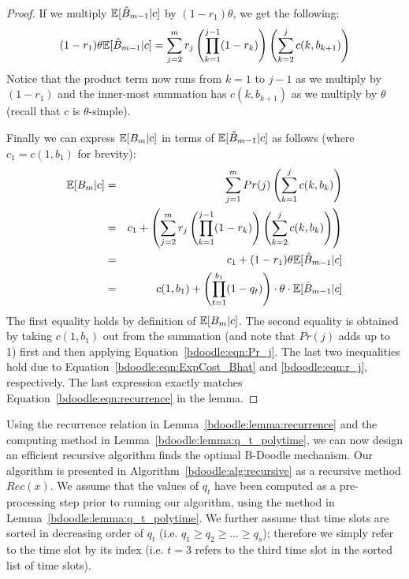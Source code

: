 \begin{proof}
If we multiply $\mathbb{E}[\hat{B}_{m-1}|c]$ by $(1 - r_1)\theta$, we get the following:
\begin{equation} \label{bdoodle:eqn:ExpCost_Bhat}
(1-r_1)\theta \mathbb{E}[\hat{B}_{m-1}|c] = \sum_{j=2}^{m} r_{j} \left(\prod_{k=1}^{j-1} (1 - r_{k})\right) \left(\sum_{k=2}^{j} c(k, b_{k+1})\right)
\end{equation}
Notice that the product term now runs from $k = 1$ to $j-1$ as we multiply by $(1-r_1)$ and the inner-most summation has $c(k, b_{k+1})$ as we multiply by $\theta$ (recall that $c$ is $\theta$-simple).

Finally we can express $\mathbb{E}[B_m|c]$ in terms of $\mathbb{E}[\hat{B}_{m-1}|c]$ as follows (where $c_1 = c(1, b_1)$ for brevity):
\begin{eqnarray*} 
\mathbb{E}[B_{m}|c]
&=& \sum_{j=1}^{m} Pr(j) \left(\sum_{k=1}^{j} c(k, b_k)\right) \\
&=& c_1 + \left(\sum_{j=2}^{m} r_j \left(\prod_{k=1}^{j-1} (1 - r_k)\right) \left(\sum_{k=2}^{j} c(k, b_k)\right) \right) \\
&=& c_1 + (1-r_1)\theta \mathbb{E}[\hat{B}_{m-1}|c] \\
&=& c(1, b_1) + \left(\prod_{t=1}^{b_1} (1-q_t) \right)\cdot \theta \cdot \mathbb{E}[\hat{B}_{m-1}|c] 
\end{eqnarray*}
The first equality holds by definition of $\mathbb{E}[B_{m}|c]$. The second equality is obtained by taking $c(1, b_1)$ out from the summation (and note that $Pr(j)$ adds up to 1) first and then applying Equation~\ref{bdoodle:eqn:Pr_j}. The last two inequalities hold due to Equation~\ref{bdoodle:eqn:ExpCost_Bhat} and \ref{bdoodle:eqn:r_j}, respectively. 
The last expression exactly  matches Equation~\ref{bdoodle:eqn:recurrence} in the lemma.
\end{proof}

Using the recurrence relation in Lemma~\ref{bdoodle:lemma:recurrence} and the computing method in Lemma~\ref{bdoodle:lemma:q_t_polytime}, we can now design an efficient recursive algorithm finds the optimal B-Doodle mechanism. Our algorithm is presented in Algorithm~\ref{bdoodle:alg:recursive} as a recursive method $Rec(x)$. We assume that the values of $q_t$ have been computed as a pre-processing step prior to running our algorithm, using the method in Lemma~\ref{bdoodle:lemma:q_t_polytime}. We further assume that time slots are sorted in decreasing order of $q_t$ (i.e. $q_1 \geq q_2 \geq \dots \geq q_{s}$); therefore we simply refer to the time slot by its index (i.e. $t = 3$ refers to the third time slot in the sorted list of time slots).

